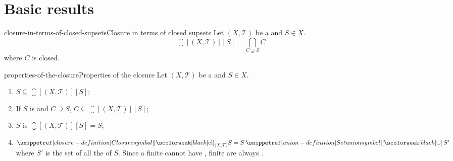 \documentclass[preview]{standalone}
\begin{document}
\genpage

\section{Basic results}

\newcommand\ts{{(X, \mathcal{T})}}

\begin{snippettheorem}{closure-in-terms-of-closed-supsets}{Closure in terms of closed supsets}
    Let \(\ts\) be a \topologicalspace and \(S\in X\).
    \[
        \closure[\ts][S] = \bigcap_{C \supseteq S} C
    \]
    where \(C\) is closed.
\end{snippettheorem}

\begin{snippetproposition}{properties-of-the-closure}{Properties of the closure}
    Let \(\ts\) be a \topologicalspace and \(S\in X\).
    \begin{enumerate}
        \item \(S \subseteq \closure[\ts][S]\);
        \item If \(S\) is \closedset[closed] and \(C \supseteq S\), \(C \subseteq \closure[\ts][S]\);
        \item \(S\) is \closedset[closed] \ifandonlyif \(\closure[\ts][S] = S\);
        \item \(\closure[\ts][S] = S \union S'\) where \(S'\)
        is the set of all the \accumulationpoint of \(S\).
        Since a finite \set cannot have ,
        finite \set[sets] are always \closedset[closed].
    \end{enumerate}
\end{snippetproposition}
\end{document}
